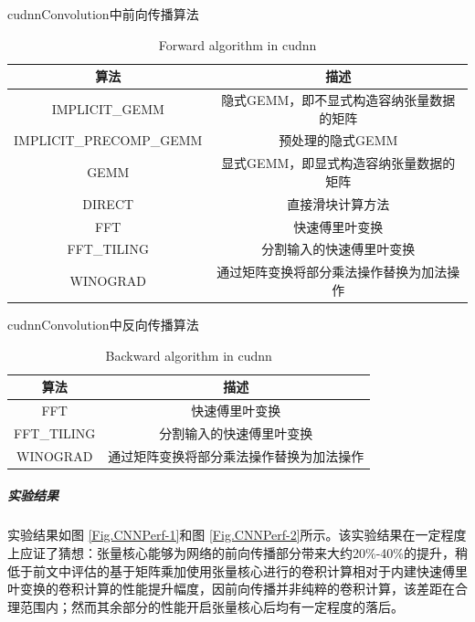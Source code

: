 \begin{table}
	\centering
	\renewcommand{\thetable}{\arabic{section}-\arabic{table} }
	\renewcommand{\tablename}{表}
	\caption{cudnnConvolution中前向传播算法}
	\addtocounter{table}{-1}
	\renewcommand{\thetable}{\arabic{section}-\arabic{table} }
	\renewcommand{\tablename}{Table}
	\caption{Forward algorithm in cudnn}
	\begin{tabular}{cc}
		\toprule
		算法 & 描述\\
		\midrule
		IMPLICIT\_GEMM & 隐式GEMM，即不显式构造容纳张量数据的矩阵\\
		IMPLICIT\_PRECOMP\_GEMM & 预处理的隐式GEMM\\
		GEMM & 显式GEMM，即显式构造容纳张量数据的矩阵\\
		DIRECT & 直接滑块计算方法\\
		FFT & 快速傅里叶变换\\
		FFT\_TILING & 分割输入的快速傅里叶变换\\
		WINOGRAD & 通过矩阵变换将部分乘法操作替换为加法操作\\
		\bottomrule
	\end{tabular} \label{table-FWDALGO} 
\end{table}
\begin{table}
	\centering
	\renewcommand{\thetable}{\arabic{section}-\arabic{table} }
	\renewcommand{\tablename}{表}
	\caption{cudnnConvolution中反向传播算法}
	\addtocounter{table}{-1}
	\renewcommand{\thetable}{\arabic{section}-\arabic{table} }
	\renewcommand{\tablename}{Table}
	\caption{Backward algorithm in cudnn}
	\begin{tabular}{cc}
		\toprule
		算法 & 描述\\
		\midrule
		FFT & 快速傅里叶变换\\
		FFT\_TILING & 分割输入的快速傅里叶变换\\
		WINOGRAD & 通过矩阵变换将部分乘法操作替换为加法操作\\
		\bottomrule
	\end{tabular} \label{table-BWDALGO} 
\end{table}
\subparagraph{实验结果}
\par 实验结果如图 \ref{Fig.CNNPerf-1}和图 \ref{Fig.CNNPerf-2}所示。该实验结果在一定程度上应证了猜想：张量核心能够为网络的前向传播部分带来大约20\%-40\%的提升，稍低于前文中评估的基于矩阵乘加使用张量核心进行的卷积计算相对于内建快速傅里叶变换的卷积计算的性能提升幅度，因前向传播并非纯粹的卷积计算，该差距在合理范围内；然而其余部分的性能开启张量核心后均有一定程度的落后。
